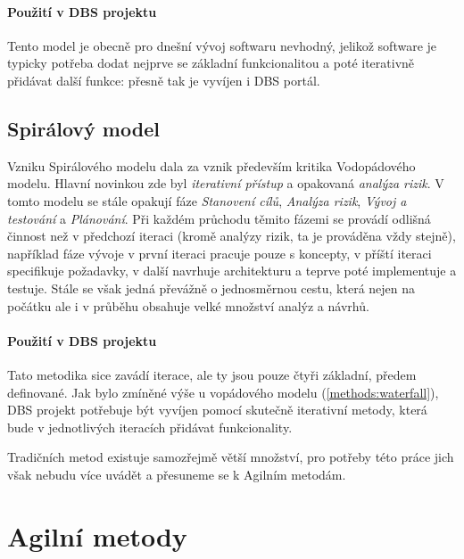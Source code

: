 \paragraph{Použití v DBS projektu}
Tento model je obecně pro dnešní vývoj softwaru nevhodný, jelikož software je typicky potřeba dodat nejprve se základní funkcionalitou a poté iterativně přidávat další funkce: přesně tak je vyvíjen i DBS portál.


\subsection{Spirálový model} \label{methods:spiral}

Vzniku Spirálového modelu dala za vznik především kritika Vodopádového modelu. Hlavní novinkou zde byl \emph{iterativní přístup} a opakovaná \emph{analýza rizik}. V tomto modelu se stále opakují fáze \emph{Stanovení cílů}, \emph{Analýza rizik}, \emph{Vývoj a testování} a \emph{Plánování}. Při každém průchodu těmito fázemi se provádí odlišná činnost než v předchozí iteraci (kromě analýzy rizik, ta je prováděna vždy stejně), například fáze vývoje v první iteraci pracuje pouze s koncepty, v příští iteraci specifikuje požadavky, v další navrhuje architekturu a teprve poté implementuje a testuje.
Stále se však jedná převážně o jednosměrnou cestu, která nejen na počátku ale i v průběhu obsahuje velké množství analýz a návrhů.

\paragraph{Použití v DBS projektu}
Tato metodika sice zavádí iterace, ale ty jsou pouze čtyři základní, předem definované. Jak bylo zmíněné výše u vopádového modelu (\ref{methods:waterfall}), DBS projekt potřebuje být vyvíjen pomocí skutečně iterativní metody, která bude v jednotlivých iteracích přidávat funkcionality.

Tradičních metod existuje samozřejmě větší množství, pro potřeby této práce jich však nebudu více uvádět a přesuneme se k Agilním metodám.


\section{Agilní metody} \label{methods:agile}

